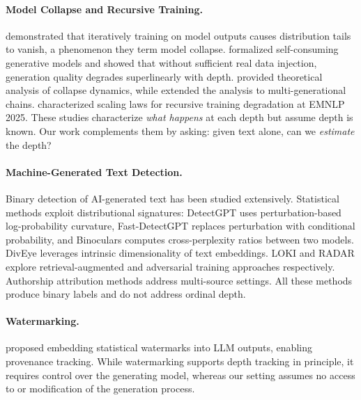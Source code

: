 \documentclass[11pt,a4paper]{article}
\begin{document}
\paragraph{Model Collapse and Recursive Training.}
\citet{shumailov2024model} demonstrated that iteratively training on model outputs causes distribution tails to vanish, a phenomenon they term model collapse.
\citet{alemohammad2024selfconsuming} formalized self-consuming generative models and showed that without sufficient real data injection, generation quality degrades superlinearly with depth.
\citet{dohmatob2024tale} provided theoretical analysis of collapse dynamics, while \citet{gerstgrasser2024model} extended the analysis to multi-generational chains.
\citet{drayson2025scaling} characterized scaling laws for recursive training degradation at EMNLP 2025.
These studies characterize \emph{what happens} at each depth but assume depth is known.
Our work complements them by asking: given text alone, can we \emph{estimate} the depth?

\paragraph{Machine-Generated Text Detection.}
Binary detection of AI-generated text has been studied extensively.
Statistical methods exploit distributional signatures: DetectGPT \citep{mitchell2023detectgpt} uses perturbation-based log-probability curvature, Fast-DetectGPT \citep{bao2024fast} replaces perturbation with conditional probability, and Binoculars \citep{hans2024spotting} computes cross-perplexity ratios between two models.
DivEye \citep{tulchinskii2024intrinsic} leverages intrinsic dimensionality of text embeddings.
LOKI \citep{pu2023loki} and RADAR \citep{hu2023radar} explore retrieval-augmented and adversarial training approaches respectively.
Authorship attribution methods \citep{uchendu2020authorship} address multi-source settings.
All these methods produce binary labels and do not address ordinal depth.

\paragraph{Watermarking.}
\citet{kirchenbauer2023watermark} proposed embedding statistical watermarks into LLM outputs, enabling provenance tracking.
While watermarking supports depth tracking in principle, it requires control over the generating model, whereas our setting assumes no access to or modification of the generation process.
\end{document}
